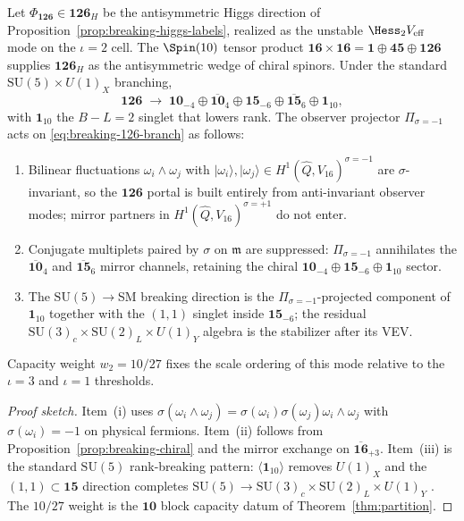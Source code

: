 \begin{lemma}[$\mathbf{126}_H$ decomposition under $\Pi_{\sigma=-1}$]
\label{lem:breaking-126-sigma}
Let $\Phi_{\mathbf{126}}\in\mathbf{126}_H$ be the antisymmetric Higgs direction
of Proposition~\ref{prop:breaking-higgs-labels}, realized as the unstable
$\Hess_2 V_{\mathrm{eff}}$ mode on the $\iota=2$ cell. The $\Spin(10)$ tensor
product $\mathbf{16}\times\mathbf{16}=\mathbf{1}\oplus\mathbf{45}\oplus
\mathbf{126}$ supplies $\mathbf{126}_H$ as the antisymmetric wedge of chiral
spinors. Under the standard $\mathrm{SU}(5)\times U(1)_X$ branching,
\begin{equation}\label{eq:breaking-126-branch}
  \mathbf{126}
  \;\longrightarrow\;
  \mathbf{10}_{-4}\oplus\overline{\mathbf{10}}_{4}
  \oplus\mathbf{15}_{-6}\oplus\overline{\mathbf{15}}_{6}
  \oplus\mathbf{1}_{10},
\end{equation}
with $\mathbf{1}_{10}$ the $B\!-\!L=2$ singlet that lowers rank. The observer
projector $\Pi_{\sigma=-1}$ acts on \eqref{eq:breaking-126-branch} as follows:
\begin{enumerate}[label=(\roman*),leftmargin=*]
  \item Bilinear fluctuations $\omega_i\wedge\omega_j$ with
    $|\omega_i\rangle,|\omega_j\rangle\in H^1(\hat Q,V_{16})^{\sigma=-1}$
    are $\sigma$-invariant, so the $\mathbf{126}$ portal is built entirely from
    anti-invariant observer modes; mirror partners in
    $H^1(\hat Q,V_{16})^{\sigma=+1}$ do not enter.
  \item Conjugate multiplets paired by $\sigma$ on $\mathfrak{m}$ are suppressed:
    $\Pi_{\sigma=-1}$ annihilates the $\overline{\mathbf{10}}_{4}$ and
    $\overline{\mathbf{15}}_{6}$ mirror channels, retaining the chiral
    $\mathbf{10}_{-4}\oplus\mathbf{15}_{-6}\oplus\mathbf{1}_{10}$ sector.
  \item The $\mathrm{SU}(5)\to$SM breaking direction is the
    $\Pi_{\sigma=-1}$-projected component of $\mathbf{1}_{10}$ together with
    the $(1,1)$ singlet inside $\mathbf{15}_{-6}$; the residual
    $\mathrm{SU}(3)_c\times\mathrm{SU}(2)_L\times U(1)_Y$ algebra is the
    stabilizer after its VEV.
\end{enumerate}
Capacity weight $w_2=10/27$ fixes the scale ordering of this mode relative to
the $\iota=3$ and $\iota=1$ thresholds.
\end{lemma}

\begin{proof}[Proof sketch]
Item~(i) uses $\sigma(\omega_i\wedge\omega_j)=\sigma(\omega_i)\sigma(\omega_j)
\omega_i\wedge\omega_j$ with $\sigma(\omega_i)=-1$ on physical fermions.
Item~(ii) follows from Proposition~\ref{prop:breaking-chiral} and the mirror
exchange on $\overline{\mathbf{16}}_{+3}$. Item~(iii) is the standard
$\mathrm{SU}(5)$ rank-breaking pattern: $\langle\mathbf{1}_{10}\rangle$ removes
$U(1)_X$ and the $(1,1)\subset\mathbf{15}$ direction completes
$\mathrm{SU}(5)\to\mathrm{SU}(3)_c\times\mathrm{SU}(2)_L\times U(1)_Y$
\cite{GeorgiGlashow1974,Witten1985}. The $10/27$ weight is the $\mathbf{10}$
block capacity datum of Theorem~\ref{thm:partition}.
\end{proof}

